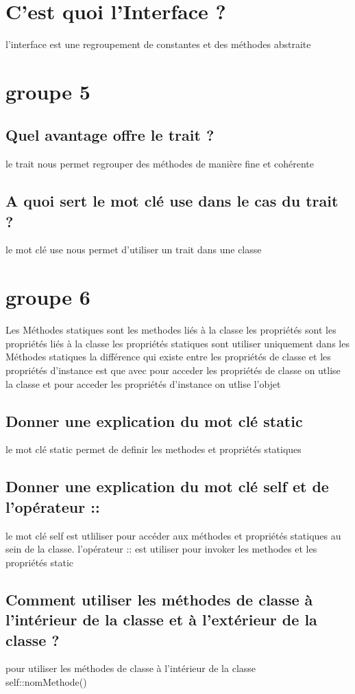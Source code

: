 \documentclass[12pt,b5paper]{article}
\begin{document}
\section{C’est quoi l’Interface ?}
l'interface est une regroupement de constantes et des méthodes abstraite
\section{groupe 5}
\subsection{Quel avantage offre le trait ?} 
le trait  nous permet regrouper des méthodes de manière fine et cohérente
\subsection{A quoi sert le mot clé use dans le cas du trait ?} 
le mot clé use nous permet d'utiliser un trait dans une classe
\section{groupe 6}
Les Méthodes statiques sont les methodes liés à la classe 
les propriétés sont les propriétés liés à la classe
les propriétés statiques sont utiliser uniquement dans les Méthodes statiques
la différence qui existe entre les propriétés de classe et les propriétés d’instance
est que avec  pour acceder les propriétés de classe on utlise la classe et pour
acceder les propriétés d'instance on utlise l'objet
\subsection{Donner une explication du mot clé static}
le mot clé static permet de definir les methodes et propriétés statiques


\subsection{Donner une explication du mot clé self et de l’opérateur ::}
le mot clé self est utliliser pour accéder aux méthodes et propriétés statiques au sein de la classe.
 l’opérateur :: est utiliser pour invoker les methodes et les propriétés static

\subsection{Comment utiliser les méthodes de classe à l’intérieur de la classe et à l’extérieur de la
classe ?}
pour  utiliser les méthodes de classe à l’intérieur de la classe \\
self::nomMethode()\\
\end{document}
